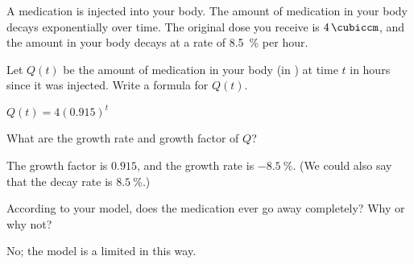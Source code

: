 \begin{problem}[Medication]
A medication is injected into your body. The amount of medication in your 
body decays exponentially over time. The original dose you receive is $\SI{4}{\cubiccm}$, and 
the amount in your body decays at a rate of \SI{8.5}{\percent} per hour.
\begin{subproblem}
	Let $Q(t)$ be the amount of medication in your body (in \si{\cubiccm}) at time $t$ in hours since 
	it was injected. Write a formula for $Q(t)$.
	\begin{shortsolution}
		$Q(t)=4(0.915)^t$
	\end{shortsolution}
\end{subproblem}
\begin{subproblem}
	What are the growth rate and growth factor of $Q$?
	\begin{shortsolution}
		The growth factor is $0.915$, and the growth rate is $\SI{-8.5}{\percent}$.  (We could also say that the decay rate is $\SI{8.5}{\percent}$.)
	\end{shortsolution}
\end{subproblem}
\begin{subproblem}
	According to your model, does the medication ever go away completely? Why or why not?
	\begin{shortsolution}
		No; the model is a limited in this way.
	\end{shortsolution}
\end{subproblem}
\end{problem}

